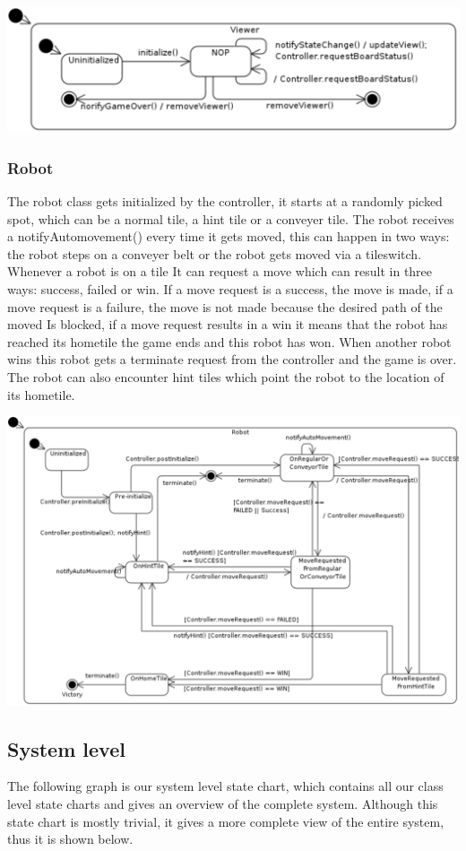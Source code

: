 	\includegraphics[width=\linewidth]{statecharts/view.pdf}

	\subsubsection{Robot}
	The robot class gets initialized by the controller, it starts at a randomly picked spot, which can be a normal tile, a hint tile or a conveyer tile. The robot receives a notifyAutomovement() every time it gets moved, this can happen in two ways: the robot steps on a conveyer belt or the robot gets moved via a tileswitch. Whenever a robot is on a tile It can request a move which can result in three ways: success, failed or win. If a move request is a success, the move is made, if a move request is a failure, the move is not made because the desired path of the moved Is blocked, if a move request results in a win it means that the robot has reached its hometile the game ends and this robot has won. When another robot wins this robot gets a terminate request from the controller and the game is over. The robot can also encounter hint tiles which point the robot to the location of its hometile.
	
	\includegraphics[width=\linewidth]{statecharts/robot.pdf}

\subsection{System level}
	The following graph is our system level state chart, which contains all our class level state charts and gives an overview of the complete system. Although this state chart is mostly trivial, it gives a more complete view of the entire system, thus it is shown below.

